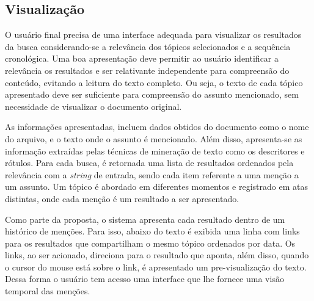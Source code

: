 
\subsection{Visualização}

O usuário final precisa de uma interface adequada para visualizar os resultados da busca considerando-se a relevância dos tópicos selecionados e a sequência cronológica. Uma boa apresentação deve permitir ao usuário identificar a relevância os resultados e ser relativante independente para compreensão do conteúdo, evitando a leitura do texto completo. Ou seja, o texto de cada tópico apresentado deve ser suficiente para compreensão do assunto mencionado, sem necessidade de visualizar o documento original.

As informações apresentadas, incluem dados obtidos do documento como o nome do arquivo, e o texto onde o assunto é mencionado. Além disso, apresenta-se as informação extraídas pelas técnicas de mineração de texto como os descritores e rótulos. Para cada busca, é retornada uma lista de resultados ordenados pela relevância com a \textit{string} de entrada, sendo cada item referente a uma menção a um assunto. Um tópico é abordado em diferentes momentos e registrado em atas distintas, onde cada menção é um resultado a ser apresentado. 

Como parte da proposta, o sistema apresenta cada resultado dentro de um histórico de menções. Para isso, abaixo do texto é exibida uma linha com links para os resultados que compartilham o mesmo tópico ordenados por data. Os links, ao ser acionado, direciona para o resultado que aponta, além disso, quando o cursor do mouse está sobre o link, é apresentado um pre-visualização do texto. Dessa forma o usuário tem acesso uma interface que lhe fornece uma visão temporal das menções.







